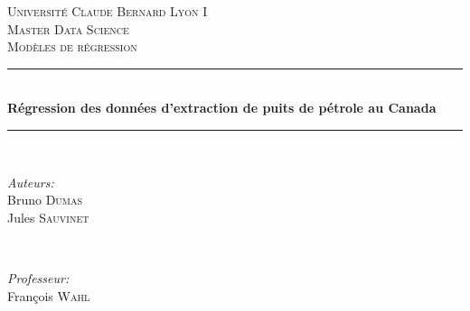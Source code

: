 \documentclass[12pt]{article}
\begin{document}
\begin{titlepage}

\newcommand{\HRule}{\rule{\linewidth}{0.5mm}} %

\center %
 

\textsc{\LARGE Universit\'e Claude Bernard Lyon I}\\[1.5cm] %
\textsc{\Large Master Data Science}\\[0.5cm] %
\textsc{\large Mod\`eles de r\'egression}\\[0.5cm] %


\HRule \\[0.4cm]
{ \huge \bfseries R\'egression des donn\'ees d'extraction de puits de p\'etrole au Canada}\\[0.4cm] %
\HRule \\[1.5cm]
 

\begin{minipage}{0.4\textwidth}
\begin{flushleft} \large
\emph{Auteurs:}\\
Bruno \textsc{Dumas}\\%
Jules \textsc{Sauvinet}
\end{flushleft}
\end{minipage}
~
\begin{minipage}{0.4\textwidth}
\begin{flushright} \large
\emph{Professeur:} \\
Fran\c cois \textsc{Wahl} %
\end{flushright}
\end{minipage}\\[2cm]


\end{titlepage}
\end{document}
